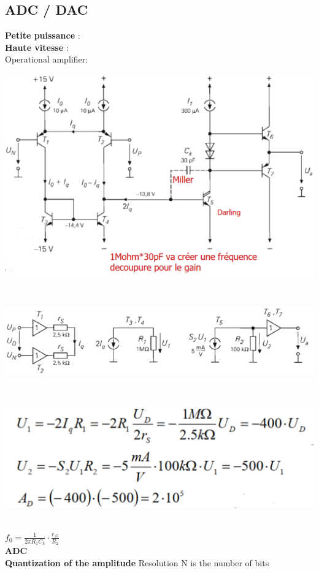 \documentclass[resume]{subfiles}
\begin{document}
\begin{multicols}{3}
\section{ADC / DAC}
\textbf{Petite puissance} :\\
\textbf{Haute vitesse} :\\
Operational amplifier:\\
\begin{minipage}{\linewidth}
	\centering
    \includegraphics[width =0.7\columnwidth]{an17.png}
\end{minipage}\\
\begin{minipage}{\linewidth}
	\centering
    \includegraphics[width =0.7\columnwidth]{an18.png}
\end{minipage}\\
\begin{minipage}{\linewidth}
	\centering
    \includegraphics[width =0.7\columnwidth]{an19.png}
\end{minipage}\\
$f_0 = \frac{1}{2\pi R_1C_k}\cdot \frac{r_{s5}}{R_2}$\\
{\Large \textbf{ADC}}\\
\textbf{Quantization of the amplitude}
Resolution N is the number of bits \\

\end{multicols}
\end{document}
